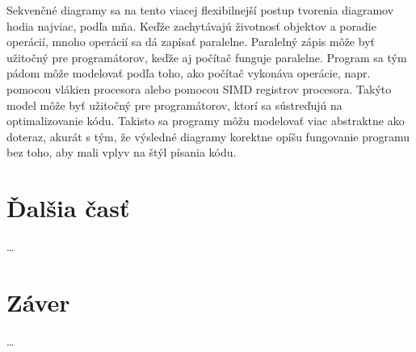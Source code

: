 \documentclass[10pt,twoside,slovak,a4paper]{article}
\begin{document}
\noindent Sekvenčné diagramy sa na tento viacej flexibilnejší postup tvorenia diagramov hodia najviac, podľa mňa. Keďže zachytávajú životnosť objektov a poradie operácií, mnoho operácií sa dá zapísať paralelne. Paralelný zápis môže byť užitočný pre programátorov, keďže aj počítač funguje paralelne. 
Program sa tým pádom môže modelovať podľa toho, ako počítač vykonáva operácie, napr. pomocou vlákien procesora alebo pomocou SIMD registrov procesora. Takýto model môže byť užitočný pre programátorov, ktorí sa sústreďujú na optimalizovanie kódu. 
Takisto sa programy môžu modelovať viac abstraktne ako doteraz, akurát s tým, že výsledné diagramy korektne opíšu fungovanie programu bez toho, aby mali vplyv na štýl písania kódu. \newline

\section{Ďalšia časť}
\ldots

\section{Záver}
\ldots




\end{document}
